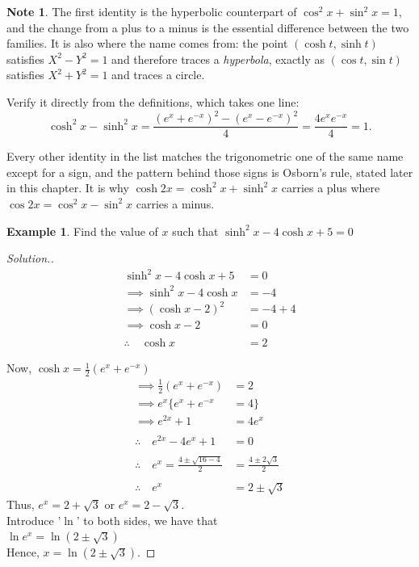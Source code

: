 \documentclass[11pt,a4paper]{article}
\theoremstyle{definition}
\newtheorem{example}[thm]{Example}
\newtheorem{note}[thm]{Note}
\newenvironment{solution}
  {\renewcommand{\qedsymbol}{}\begin{proof}[\textit{Solution}.]}
  {\end{proof}}
\begin{document}
\begin{note}
The first identity is the hyperbolic counterpart of $\cos^{2}x+\sin^{2}x=1$, and
the change from a plus to a minus is the essential difference between the two
families. It is also where the name comes from: the point
$(\cosh t,\sinh t)$ satisfies $X^{2}-Y^{2}=1$ and therefore traces a
\emph{hyperbola}, exactly as $(\cos t,\sin t)$ satisfies $X^{2}+Y^{2}=1$ and traces
a circle.

Verify it directly from the definitions, which takes one line:
$$\cosh^{2}x-\sinh^{2}x
=\frac{\left(e^{x}+e^{-x}\right)^{2}-\left(e^{x}-e^{-x}\right)^{2}}{4}
=\frac{4e^{x}e^{-x}}{4}=1 .$$

Every other identity in the list matches the trigonometric one of the same name
except for a sign, and the pattern behind those signs is Osborn's rule, stated
later in this chapter. It is why $\cosh 2x=\cosh^{2}x+\sinh^{2}x$ carries a plus
where $\cos 2x=\cos^{2}x-\sin^{2}x$ carries a minus.
\end{note}


\begin{example}

Find the value of $x$ such that $\sinh^2x-4\cosh x +5=0$
\end{example}
\begin{solution}

\begin{align*}
\sinh^2x -4\cosh x +5 & = 0\\
\implies \sinh^2x-4\cosh x & = -4\\
\implies (\cosh x-2)^2 & =-4+4\\
\implies \cosh x -2 & = 0\\\\
\therefore \quad  \cosh x & =2
\end{align*}

Now, $\cosh x =\frac{1}{2}(e^x+e^{-x})$\\

\begin{align*}
\displaystyle
\implies \frac{1}{2}(e^x+e^{-x}) & =2\\
\implies e^x\{e^x+e^{-x} & = 4\}\\
\implies e^{2x}+1 & =4e^x\\\\
\therefore \quad e^{2x}-4e^x+1 &=0\\\\
\therefore \quad  e^x=\frac{4\pm \sqrt{16-4}}{2}& =\frac{4\pm 2\sqrt{3}}{2}\\\\
\therefore\quad  e^x &=2\pm \sqrt{3}
\end{align*}
Thus, $e^x=2+\sqrt{3}$ or $e^x=2-\sqrt{3}$.\\

Introduce '$\ln$' to both sides, we have that\\

$\ln e^x=\ln (2\pm \sqrt{3})$\\

Hence, $x=\ln (2\pm \sqrt{3})$.
\end{solution}
\end{document}
